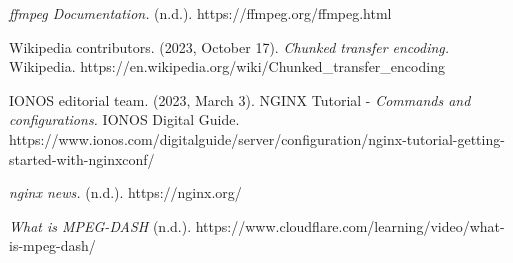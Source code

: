 \documentclass[spanish]{article}
\begin{document}
\begin{thebibliography}{X}
\item \textit{ffmpeg Documentation.} (n.d.).
https://ffmpeg.org/ffmpeg.html\\
\item Wikipedia contributors. (2023, October 17).
\textit{Chunked transfer encoding.} Wikipedia.
https://en.wikipedia.org/wiki/Chunked\_transfer\_encoding\\
\item IONOS editorial team. (2023, March 3). NGINX Tutorial
- \textit{Commands and configurations.} IONOS Digital Guide. https://www.ionos.com/digitalguide/server/configuration/nginx-tutorial-getting-started-with-nginxconf/
\item \textit{nginx news.} (n.d.). https://nginx.org/\\
\item \textit{What is MPEG-DASH} (n.d.). https://www.cloudflare.com/learning/video/what-is-mpeg-dash/
\end{thebibliography}
\end{document}
